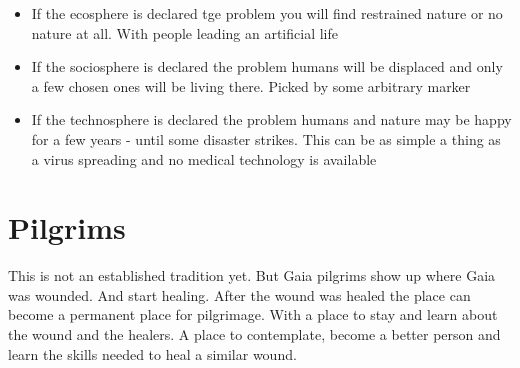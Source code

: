 \begin{itemize}
    \item If the ecosphere is declared tge problem you will find restrained nature or no nature at all. With people leading an artificial life
    \item If the sociosphere is declared the problem humans will be displaced and only a few chosen ones will be living there. Picked by some arbitrary marker
    \item If the technosphere is declared the problem humans and nature may be happy for a few years - until some disaster strikes. This can be as simple a thing as a virus spreading and no medical technology is available
\end{itemize}

\section{Pilgrims}

This is not an established tradition yet. But Gaia pilgrims show up where Gaia was wounded. And start healing. After the wound was healed the place can become a permanent place for pilgrimage. With a place to stay and learn about the wound and the healers. A place to contemplate, become a better person and learn the skills needed to heal a similar wound.




